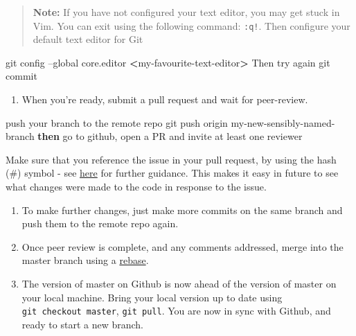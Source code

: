 \documentclass[]{book}
\newenvironment{Shaded}{\begin{snugshade}}{\end{snugshade}}
\newcommand{\ExtensionTok}[1]{#1}
\newcommand{\FunctionTok}[1]{\textcolor[rgb]{0.00,0.00,0.00}{#1}}
\newcommand{\KeywordTok}[1]{\textcolor[rgb]{0.13,0.29,0.53}{\textbf{#1}}}
\newcommand{\NormalTok}[1]{#1}
\newcommand{\OperatorTok}[1]{\textcolor[rgb]{0.81,0.36,0.00}{\textbf{#1}}}
\providecommand{\tightlist}{%
  \setlength{\itemsep}{0pt}\setlength{\parskip}{0pt}}
\begin{document}
\begin{quote}
\textbf{Note:}
If you have not configured your text editor, you may get stuck in Vim. You can exit using the following command: \texttt{:q!}. Then configure your default text editor for Git
\end{quote}

\begin{Shaded}
\begin{Highlighting}[]
\FunctionTok{git}\NormalTok{ config --global core.editor }\OperatorTok{<}\NormalTok{my-favourite-text-editor}\OperatorTok{>}
 \ExtensionTok{Then}\NormalTok{ try again}
\FunctionTok{git}\NormalTok{ commit}
\end{Highlighting}
\end{Shaded}

\begin{enumerate}
\def\labelenumi{\arabic{enumi}.}
\setcounter{enumi}{4}
\tightlist
\item
  When you're ready, submit a pull request and wait for peer-review.
\end{enumerate}

\begin{Shaded}
\begin{Highlighting}[]
\ExtensionTok{push}\NormalTok{ your branch to the remote repo}
\FunctionTok{git}\NormalTok{ push origin my-new-sensibly-named-branch}
\KeywordTok{then} \ExtensionTok{go}\NormalTok{ to github, open a PR and invite at least one reviewer}
\end{Highlighting}
\end{Shaded}

Make sure that you reference the issue in your pull request, by using the hash (\#) symbol - see \href{https://help.github.com/articles/autolinked-references-and-urls/}{here} for further guidance. This makes it easy in future to see what changes were made to the code in response to the issue.

\begin{enumerate}
\def\labelenumi{\arabic{enumi}.}
\setcounter{enumi}{5}
\item
  To make further changes, just make more commits on the same branch and push them to the remote repo again.
\item
  Once peer review is complete, and any comments addressed, merge into the master branch using a \href{https://github.com/blog/2243-rebase-and-merge-pull-requests}{rebase}.
\item
  The version of master on Github is now ahead of the version of master on your local machine. Bring your local version up to date using \texttt{git\ checkout\ master}, \texttt{git\ pull}. You are now in sync with Github, and ready to start a new branch.
\end{enumerate}
\end{document}
